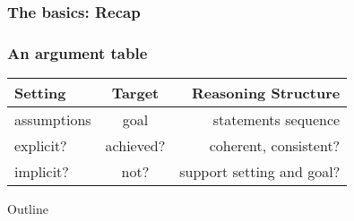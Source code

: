 \documentclass{beamer}
\begin{document}
\subsubsection{The basics: Recap} 
\begin{frame}\frametitle{An argument table}
\begin{center}
\begin{tabular}{|l|c|r|}
\hline
\textbf{Setting} & \textbf{Target} & \textbf{Reasoning Structure}\\
\hline 
assumptions & goal & statements sequence\\
\hline 
explicit? & achieved? & coherent, consistent?\\
\hline
implicit? & not? & support setting and goal? \\
\hline
\end{tabular}
\end{center}
\end{frame}


\begin{frame}
  \titlepage
\end{frame}

\begin{frame}{Outline}
  \tableofcontents
\end{frame}



\end{document}
